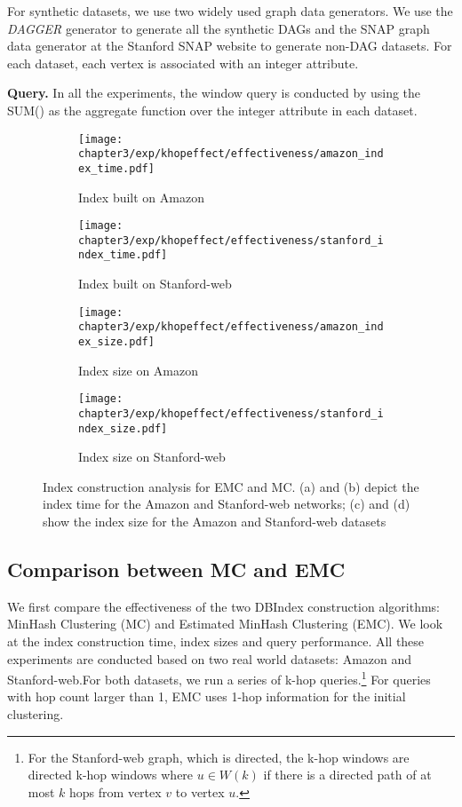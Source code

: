 For synthetic datasets, we use two widely used graph data generators. 
We use the \emph{DAGGER} generator \cite{yildirim2013dagger} to generate 
all the synthetic DAGs and the SNAP graph data generator at the
Stanford SNAP website to generate non-DAG datasets. For each dataset, each vertex is associated with an integer attribute.

\textbf{Query.} In all the experiments, the window query is conducted 
by using the SUM() as the aggregate function over the integer attribute in each dataset. 

\begin{figure*}[t]
\centering
\begin{subfigure}{0.45\textwidth}
  \texttt{[image: chapter3/exp/khopeffect/effectiveness/amazon\_index\_time.pdf]}
  \caption{Index built on Amazon}
\end{subfigure}
\begin{subfigure}{0.45\textwidth}
  \texttt{[image: chapter3/exp/khopeffect/effectiveness/stanford\_index\_time.pdf]}
  \caption{Index built on Stanford-web}
\end{subfigure}

\begin{subfigure}{0.45\textwidth}
  \texttt{[image: chapter3/exp/khopeffect/effectiveness/amazon\_index\_size.pdf]}
  \caption{Index size on Amazon}
\end{subfigure}
\begin{subfigure}{0.45\textwidth}
  \texttt{[image: chapter3/exp/khopeffect/effectiveness/stanford\_index\_size.pdf]}
  \caption{Index size on Stanford-web}
\end{subfigure}
\caption{Index construction analysis for EMC and MC. (a) and (b) 
depict the index time for the Amazon and Stanford-web networks; 
(c) and (d) show the index size for the Amazon and Stanford-web datasets}
\label{fig:index_analysis_emc_mc}
\end{figure*}


\subsection{Comparison between MC and EMC}
We first compare the effectiveness of the two DBIndex 
construction algorithms: MinHash Clustering (MC) and Estimated 
MinHash Clustering (EMC). We look at 
the index construction time, index sizes and query performance. 
All these experiments are conducted based on two real world datasets: 
Amazon and Stanford-web.For both datasets, we run a series of k-hop queries.\footnote{For the Stanford-web graph, which is directed,
the k-hop windows are directed k-hop windows where $u \in W(k)$ if there is a directed path
of at most $k$ hops from vertex $v$ to vertex $u$.
} For queries with hop count larger than 1, 
EMC uses 1-hop information for the initial clustering. 

